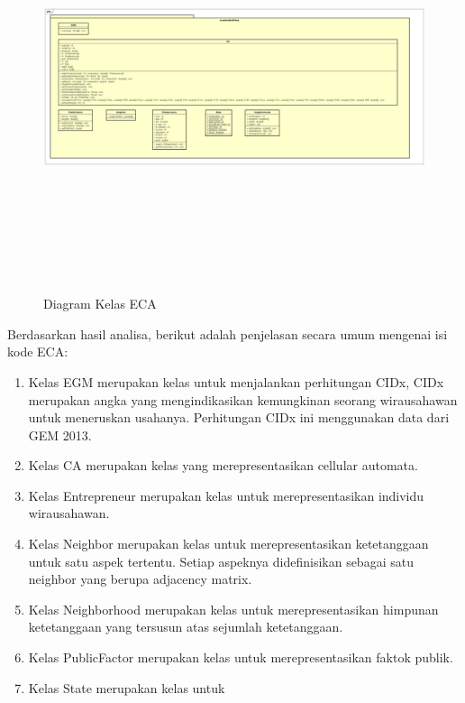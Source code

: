 	\begin{figure} [H]
		\centering  
		\includegraphics[width=18cm, height=12cm]{ClassDiagram1} 
		\caption[Diagram Kelas ECA]{Diagram Kelas ECA} 
		\label{fig:CD1} 
	\end{figure}
	
	Berdasarkan hasil analisa, berikut adalah penjelasan secara umum mengenai isi kode ECA:
\begin{enumerate}
	\item Kelas EGM merupakan kelas untuk menjalankan perhitungan CIDx, CIDx merupakan angka yang mengindikasikan kemungkinan seorang wirausahawan untuk meneruskan usahanya. Perhitungan CIDx ini menggunakan data dari GEM 2013.
	\item Kelas CA merupakan kelas yang merepresentasikan cellular automata.
	\item Kelas Entrepreneur merupakan kelas untuk merepresentasikan individu wirausahawan.
	\item Kelas Neighbor merupakan kelas untuk merepresentasikan ketetanggaan untuk satu aspek tertentu. Setiap aspeknya didefinisikan sebagai satu neighbor yang berupa adjacency matrix.
	\item Kelas Neighborhood merupakan kelas untuk merepresentasikan himpunan ketetanggaan yang tersusun atas sejumlah ketetanggaan.
	\item Kelas PublicFactor merupakan kelas untuk merepresentasikan faktok publik.
	\item Kelas State merupakan kelas untuk 
\end{enumerate}
	




